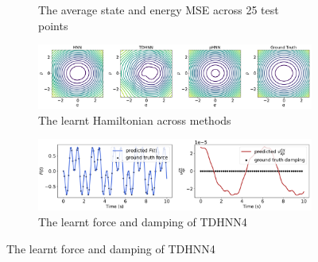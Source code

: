\documentclass{article}
\begin{document}
\begin{figure}[!htb]
\begin{subfigure}[b]{0.48\textwidth}
\caption{The average state and energy MSE across 25 test points}
\end{subfigure}
\begin{subfigure}[b]{0.48\textwidth}
\includegraphics[width=\textwidth]{figures/figures/forced_mass_spring/2/forced_mass_spring_hamiltonian_0.pdf}
\caption{The learnt Hamiltonian across methods}
\end{subfigure}
\begin{subfigure}[b]{0.48\textwidth}
\includegraphics[width=\textwidth]{figures/figures/forced_mass_spring/2/forced_mass_spring_dpdt_new_0.pdf}
\caption{The learnt force and damping of TDHNN4}
\end{subfigure}
\label{forced_mpsring_2_full}
\end{figure}
\end{document}
